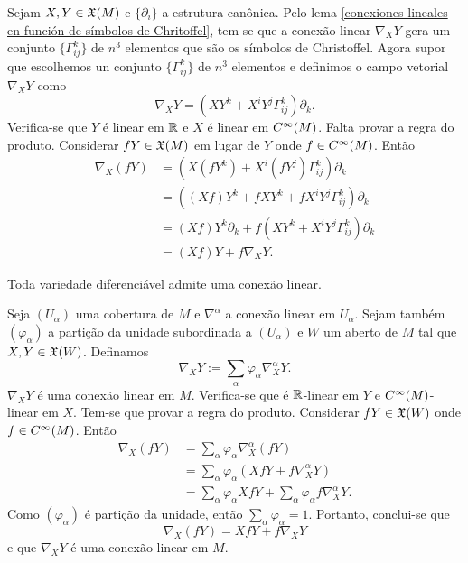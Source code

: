 \begin{demonstracao}
	Sejam $X,Y \in \mathfrak{X}(M)$ e $\{ \partial_i \}$ a estrutura canônica. Pelo lema \ref{conexiones lineales en función de símbolos de Chritoffel}, tem-se que a conexão linear $\nabla_X Y$ gera um conjunto $\{ \Gamma_{ij}^k \}$ de $n^3$ elementos que são os símbolos de Christoffel. Agora supor que escolhemos un conjunto $\{ \Gamma_{ij}^k \} $ de $n^3$ elementos e definimos o campo vetorial $\nabla_X Y$ como
	\begin{equation*}
		\nabla_X Y = (X Y^k + X^i Y^j \Gamma_{ij}^k) \partial_k.
	\end{equation*}
	Verifica-se que $Y$ é linear em $\mathbb{R}$ e $X$ é linear em $C^\infty(M)$. Falta provar a regra do produto. Considerar $fY \in \mathfrak{X}(M)$ em lugar de $Y$ onde $f \in C^\infty(M)$. Então
	\begin{align*}
		\nabla_X (fY) &= (X(f Y^k) + X^i (f Y^j) \Gamma_{ij}^k) \partial_k\\
		&= ( (Xf) Y^k + f X Y^k + f X^i Y^j \Gamma_{ij}^k ) \partial_k\\
		&= (Xf) Y^k \partial_k + f (X Y^k + X^i Y^j \Gamma_{ij}^k) \partial_k\\
		&= (Xf) Y + f \nabla_X Y.
	\end{align*}
\end{demonstracao}

\begin{proposicao}
	Toda variedade diferenciável admite uma conexão linear.
\end{proposicao}

\begin{demonstracao}
	Seja $(U_{\alpha})$ uma cobertura de $M$ e $\nabla^{\alpha}$ a conexão linear em $U_{\alpha}$. Sejam também $(\varphi_{\alpha})$ a partição da unidade subordinada a $(U_{\alpha})$ e $W$ um aberto de $M$ tal que $X,Y \in \mathfrak{X}(W)$. Definamos
	\begin{equation*}
		\nabla_X Y := \sum_{\alpha} \varphi_{\alpha} \nabla_X^{\alpha} Y.
	\end{equation*}
	$\nabla_X Y$ é uma conexão linear em $M$. Verifica-se que é $\mathbb{R}$-linear em $Y$ e $C^\infty(M)$-linear em $X$. Tem-se que provar a regra do produto. Considerar $fY \in \mathfrak{X}(W)$ onde $f \in C^\infty(M)$. Então
	\begin{align*}
		\nabla_X (fY) &= \sum_{\alpha} \varphi_{\alpha} \nabla_X^{\alpha} (fY)\\
		&= \sum_{\alpha} \varphi_{\alpha} (Xf Y + f \nabla_X^{\alpha} Y)\\
		&= \sum_{\alpha} \varphi_{\alpha} X f Y + \sum_{\alpha} \varphi_{\alpha} f \nabla_X^{\alpha} Y. 
	\end{align*}
	Como $(\varphi_{\alpha})$ é partição da unidade, então $\sum_{\alpha} \varphi_{\alpha} = 1$. Portanto, conclui-se que
	\begin{equation*}
		\nabla_X (fY) = X f Y + f \nabla_X Y
	\end{equation*}
	e que $\nabla_X Y$ é uma conexão linear em $M$.
\end{demonstracao}

